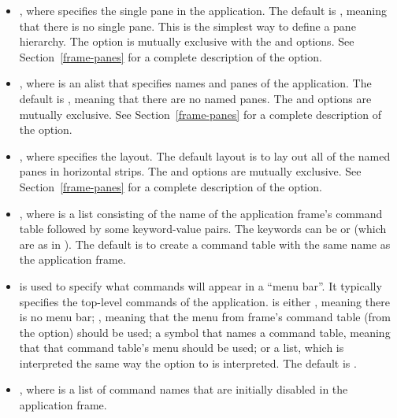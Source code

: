 \begin{itemize}
\item {} , where  specifies the single pane in the
application.  The default is , meaning that there is no single pane.
This is the simplest way to define a pane hierarchy.  The  option is
mutually exclusive with the  and  options.  See
Section~\ref{frame-panes} for a complete description of the  option.

\item {} , where  is an alist that specifies names
and panes of the application.  The default is , meaning that there are
no named panes.  The  and  options are mutually exclusive.
See Section~\ref{frame-panes} for a complete description of the 
option.

\item {} , where  specifies the layout.  The
default layout is to lay out all of the named panes in horizontal strips.  The
 and  options are mutually exclusive.  See
Section~\ref{frame-panes} for a complete description of the 
option.

\item {} , where 
is a list consisting of the name of the application frame's command table
followed by some keyword-value pairs.  The keywords can be  or
 (which are as in ).  The default is to
create a command table with the same name as the application frame.

\item {}  is used to specify what commands will appear
in a ``menu bar''.  It typically specifies the top-level commands of the
application.   is either , meaning there is no menu bar;
, meaning that the menu from frame's command table (from the
 option) should be used; a symbol that names a command table,
meaning that that command table's menu should be used; or a list, which is
interpreted the same way the  option to  is
interpreted.  The default is .

\item {} , where  is a list
of command names that are initially disabled in the application frame.


\end{itemize}
